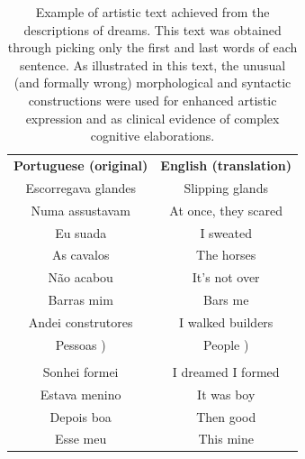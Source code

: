 \documentclass[12pt,fleqn]{article}
\begin{document}
\begin{table}[H] %
	\caption{Example of artistic text achieved from the descriptions of dreams.
	This text was obtained through picking only the first and last words of each sentence.
	As illustrated in this text, the unusual (and formally wrong) morphological and syntactic
	constructions were used for enhanced artistic expression
	and as clinical evidence of complex cognitive elaborations.}\label{tab:comecoFinal}
\vspace{2pt}
\centering{}
 \small
\begin{tabular}{  c | c }
	\textbf{Portuguese (original)}      &                                                \textbf{English (translation)} \\
Escorregava glandes              &                                                Slipping glands         \\
Numa assustavam                  &                                                At once, they scared    \\
Eu suada                         &                                                I sweated               \\
As cavalos                       &                                                The horses              \\
Não acabou                       &                                                It's not over           \\
Barras mim                       &                                                Bars me                 \\
Andei construtores               &                                                I walked builders       \\
Pessoas )                        &                                                People  )               \\
  & \\
Sonhei formei                    &                                                I dreamed I formed      \\
Estava menino                    &                                                It was boy              \\
Depois boa                       &                                                Then good               \\
Esse meu                         &                                                This mine               \\

\end{tabular}
\end{table}
\end{document}
